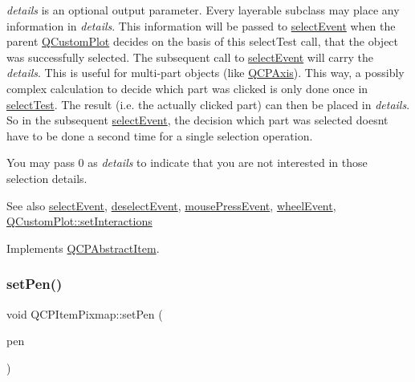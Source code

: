 {\itshape details} is an optional output parameter. Every layerable subclass may place any information in {\itshape details}. This information will be passed to \mbox{\hyperlink{class_q_c_p_abstract_item_aa4b969c58797f39c9c0b6c07c7869d17}{select\+Event}} when the parent \mbox{\hyperlink{class_q_custom_plot}{Q\+Custom\+Plot}} decides on the basis of this select\+Test call, that the object was successfully selected. The subsequent call to \mbox{\hyperlink{class_q_c_p_abstract_item_aa4b969c58797f39c9c0b6c07c7869d17}{select\+Event}} will carry the {\itshape details}. This is useful for multi-\/part objects (like \mbox{\hyperlink{class_q_c_p_axis}{Q\+C\+P\+Axis}}). This way, a possibly complex calculation to decide which part was clicked is only done once in \mbox{\hyperlink{class_q_c_p_item_pixmap_a65d1ede7bb479b90d40186d083071947}{select\+Test}}. The result (i.\+e. the actually clicked part) can then be placed in {\itshape details}. So in the subsequent \mbox{\hyperlink{class_q_c_p_abstract_item_aa4b969c58797f39c9c0b6c07c7869d17}{select\+Event}}, the decision which part was selected doesn\textquotesingle{}t have to be done a second time for a single selection operation.

You may pass 0 as {\itshape details} to indicate that you are not interested in those selection details.

\begin{DoxySeeAlso}{See also}
\mbox{\hyperlink{class_q_c_p_abstract_item_aa4b969c58797f39c9c0b6c07c7869d17}{select\+Event}}, \mbox{\hyperlink{class_q_c_p_abstract_item_af9093798cb07a861dcc73f93ca16c0c1}{deselect\+Event}}, \mbox{\hyperlink{class_q_c_p_layerable_af6567604818db90f4fd52822f8bc8376}{mouse\+Press\+Event}}, \mbox{\hyperlink{class_q_c_p_layerable_a47dfd7b8fd99c08ca54e09c362b6f022}{wheel\+Event}}, \mbox{\hyperlink{class_q_custom_plot_a5ee1e2f6ae27419deca53e75907c27e5}{Q\+Custom\+Plot\+::set\+Interactions}} 
\end{DoxySeeAlso}


Implements \mbox{\hyperlink{class_q_c_p_abstract_item_ae41d0349d68bb802c49104afd100ba2a}{Q\+C\+P\+Abstract\+Item}}.

\mbox{\label{class_q_c_p_item_pixmap_acdade1305edb4b5cae14f97fd132065f}} 
\subsubsection{\texorpdfstring{setPen()}{setPen()}}
{\footnotesize\ttfamily void Q\+C\+P\+Item\+Pixmap\+::set\+Pen (\begin{DoxyParamCaption}\item[{const Q\+Pen \&}]{pen }\end{DoxyParamCaption})}


